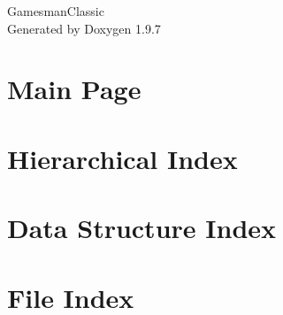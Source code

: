 \documentclass[twoside]{book}
\newcommand{\+}{\discretionary{\mbox{\scriptsize$\hookleftarrow$}}{}{}}
\newcommand{\clearemptydoublepage}{%
    \newpage{\pagestyle{empty}\cleardoublepage}%
  }
\begin{document}
  \raggedbottom
    \hypersetup{pageanchor=false,
                bookmarksnumbered=true,
                pdfencoding=unicode
               }
  \begin{titlepage}
  \vspace*{7cm}
  \begin{center}%
  {\Large Gamesman\+Classic}\\
  \vspace*{1cm}
  {\large Generated by Doxygen 1.9.7}\\
  \end{center}
  \end{titlepage}
  \clearemptydoublepage
  \tableofcontents
  \clearemptydoublepage
  \hypersetup{pageanchor=true}
\chapter{Main Page}
\label{index}\hypertarget{index}{}
\chapter{Hierarchical Index}

\chapter{Data Structure Index}

\chapter{File Index}

\end{document}
